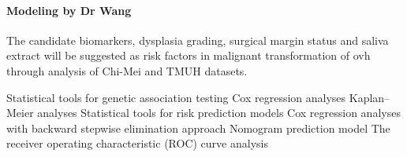 \documentclass[12pt, a4paper]{article}
\begin{document}









\paragraph{Modeling by Dr Wang}

The candidate biomarkers, dysplasia grading, surgical margin status and saliva extract will be suggested as risk factors in malignant transformation of \acrshort{ovh} through analysis of Chi-Mei and TMUH datasets.

\begin{outline}


\1 Statistical tools for genetic association testing 
\1 Cox regression analyses
\1 Kaplan--Meier analyses \1 Statistical tools for risk prediction models 
\1 Cox regression analyses
with backward stepwise elimination approach
\1 Nomogram prediction model
\1 The receiver operating characteristic (ROC) curve analysis

\end{outline}

\clearpage



%
\end{document}
